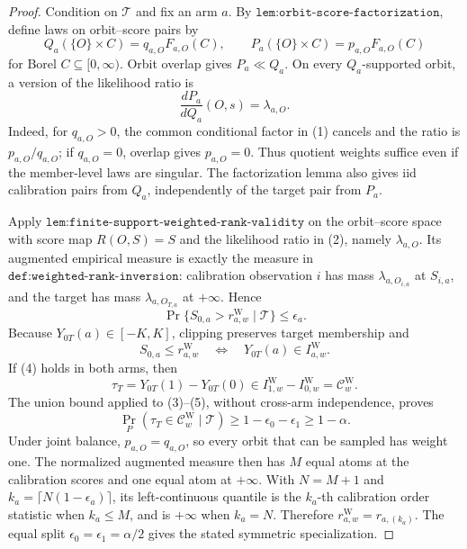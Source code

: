 \documentclass{article}
\begin{document}
\begin{proof}
Condition on \(\mathcal T\) and fix an arm \(a\). By \(\texttt{lem:orbit-score-factorization}\), define laws on orbit--score pairs by
\[
Q_a(\{O\}\times C)=q_{a,O}F_{a,O}(C),\qquad P_a(\{O\}\times C)=p_{a,O}F_{a,O}(C)
\tag{1}
\]
for Borel \(C\subseteq[0,\infty)\). Orbit overlap gives \(P_a\ll Q_a\). On every \(Q_a\)-supported orbit, a version of the likelihood ratio is
\[
\frac{dP_a}{dQ_a}(O,s)=\lambda_{a,O}.
\tag{2}
\]
Indeed, for \(q_{a,O}>0\), the common conditional factor in (1) cancels and the ratio is \(p_{a,O}/q_{a,O}\); if \(q_{a,O}=0\), overlap gives \(p_{a,O}=0\). Thus quotient weights suffice even if the member-level laws are singular. The factorization lemma also gives iid calibration pairs from \(Q_a\), independently of the target pair from \(P_a\).

Apply \(\texttt{lem:finite-support-weighted-rank-validity}\) on the orbit--score space with score map \(R(O,S)=S\) and the likelihood ratio in (2), namely \(\lambda_{a,O}\). Its augmented empirical measure is exactly the measure in \(\texttt{def:weighted-rank-inversion}\): calibration observation \(i\) has mass \(\lambda_{a,O_{i,a}}\) at \(S_{i,a}\), and the target has mass \(\lambda_{a,O_{T,a}}\) at \(+\infty\). Hence
\[
\Pr\{S_{0,a}>r^{\mathrm W}_{a,w}\mid\mathcal T\}\le\epsilon_a.
\tag{3}
\]
Because \(Y_{0T}(a)\in[-K,K]\), clipping preserves target membership and
\[
S_{0,a}\le r^{\mathrm W}_{a,w}\quad\Longleftrightarrow\quad Y_{0T}(a)\in I^{\mathrm W}_{a,w}.
\tag{4}
\]
If (4) holds in both arms, then
\[
\tau_T=Y_{0T}(1)-Y_{0T}(0)\in I^{\mathrm W}_{1,w}-I^{\mathrm W}_{0,w}=\mathcal C^{\mathrm W}_w.
\tag{5}
\]
The union bound applied to (3)--(5), without cross-arm independence, proves
\[
\Pr_P(\tau_T\in\mathcal C^{\mathrm W}_w\mid\mathcal T)\ge1-\epsilon_0-\epsilon_1\ge1-\alpha.
\]
Under joint balance, \(p_{a,O}=q_{a,O}\), so every orbit that can be sampled has weight one. The normalized augmented measure then has \(M\) equal atoms at the calibration scores and one equal atom at \(+\infty\). With \(N=M+1\) and \(k_a=\lceil N(1-\epsilon_a)\rceil\), its left-continuous quantile is the \(k_a\)-th calibration order statistic when \(k_a\le M\), and is \(+\infty\) when \(k_a=N\). Therefore \(r^{\mathrm W}_{a,w}=r_{a,(k_a)}\). The equal split \(\epsilon_0=\epsilon_1=\alpha/2\) gives the stated symmetric specialization.
\end{proof}
\end{document}
